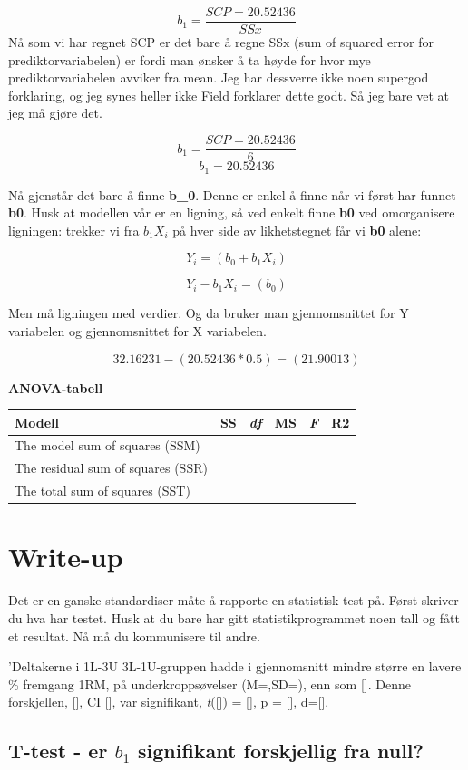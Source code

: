 \documentclass[
]{book}
\begin{document}
\[ b_1 = \frac{SCP = 20.52436}{SSx} \]
Nå som vi har regnet SCP er det bare å regne SSx (sum of squared error for prediktorvariabelen) er fordi man ønsker å ta høyde for hvor mye prediktorvariabelen avviker fra mean. Jeg har dessverre ikke noen supergod forklaring, og jeg synes heller ikke Field forklarer dette godt. Så jeg bare vet at jeg må gjøre det.

\[ b_1 = \frac{SCP = 20.52436}{6} \]
\[ b_1 = 20.52436 \]

Nå gjenstår det bare å finne \textbf{b\_0}. Denne er enkel å finne når vi først har funnet \textbf{b0}. Husk at modellen vår er en ligning, så ved enkelt finne \textbf{b0} ved omorganisere ligningen: trekker vi fra \(b_1X_i\) på hver side av likhetstegnet får vi \textbf{b0} alene:

\[
Y_i = (b_0 + b_1X_i)
\]

\[
Y_i - b_1X_i = (b_0)
\]

Men må ligningen med verdier. Og da bruker man gjennomsnittet for Y variabelen og gjennomsnittet for X variabelen.

\[
32.16231     - (20.52436*0.5) = (21.90013)
\]

\textbf{ANOVA-tabell}

\begin{longtable}[]{@{}llllll@{}}
\toprule
Modell & SS & \emph{df} & MS & \emph{F} & R2\tabularnewline
\midrule
\endhead
The model sum of squares (SSM) & & & & &\tabularnewline
The residual sum of squares (SSR) & & & & &\tabularnewline
The total sum of squares (SST) & & & & &\tabularnewline
\bottomrule
\end{longtable}

\hypertarget{write-up}{%
\chapter{Write-up}\label{write-up}}

Det er en ganske standardiser måte å rapporte en statistisk test på. Først skriver du hva har testet. Husk at du bare har gitt statistikprogrammet noen tall og fått et resultat. Nå må du kommunisere til andre.

'Deltakerne i 1L-3U 3L-1U-gruppen hadde i gjennomsnitt mindre større en lavere \% fremgang 1RM, på underkroppsøvelser (M=,SD=), enn som {[}{]}. Denne forskjellen, {[}{]}, CI {[}{]}, var signifikant, \emph{t}({[}{]}) = {[}{]}, p = {[}{]}, d={[}{]}.

\hypertarget{t-test---er-b_1-signifikant-forskjellig-fra-null}{%
\section{\texorpdfstring{T-test - er \(b_1\) signifikant forskjellig fra null?}{T-test - er b\_1 signifikant forskjellig fra null?}}\label{t-test---er-b_1-signifikant-forskjellig-fra-null}}
\end{document}
